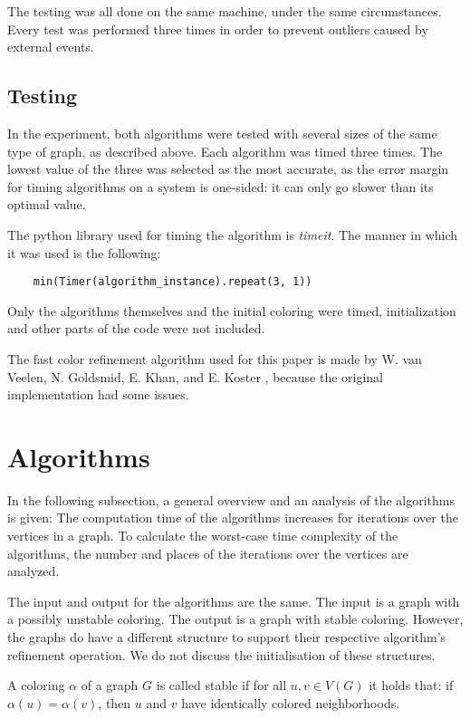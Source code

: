 \documentclass[twoside]{article}
\begin{document}
\begin{multicols}{2}
The testing was all done on the same machine, under the same circumstances. Every test was performed three times in order to prevent outliers caused by external events.

\subsection{Testing}
\label{methods:testing}
In the experiment, both algorithms were tested with several sizes of the same type of graph, as described above. Each algorithm was timed three times. The lowest value of the three was selected as the most accurate, as the error margin for timing algorithms on a system is one-sided: it can only go slower than its optimal value.

The python library used for timing the algorithm is \emph{timeit}. The manner in which it was used is the following:
\begin{lstlisting}
	min(Timer(algorithm_instance).repeat(3, 1))
\end{lstlisting}

Only the algorithms themselves and the initial coloring were timed, initialization and other parts of the code were not included.

The fast color refinement algorithm used for this paper is made by W. van Veelen, N. Goldsmid, E. Khan, and E. Koster \cite{misc:group4}, because the original implementation had some issues.

\section{Algorithms}
\label{algs}
In the following subsection, a general overview and an analysis of the algorithms is given:
The computation time of the algorithms increases for iterations over the vertices in a graph. To calculate the worst-case time complexity of the algorithms, the number and places of the iterations over the vertices are analyzed.

The input and output for the algorithms are the same. The input is a graph with a possibly unstable  coloring. The output is a graph with stable coloring. However, the graphs do have a different structure to support their respective algorithm's refinement operation. We do not discuss the initialisation of these structures.

A coloring $\alpha$ of a graph $G$ is called stable if for all $u, v \in V(G)$ it holds that: if $\alpha(u) = \alpha(v)$, then $u$ and $v$ have identically colored neighborhoods.
 


\end{multicols}
\end{document}
